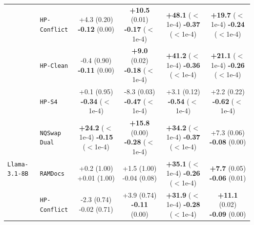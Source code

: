 \documentclass[11pt]{article}
\begin{document}
\begin{table}[t]
{{\begin{tabular}{llcccc}
& \texttt{HP-Conflict} & \shortstack{+4.3 (0.20)\\[1pt]\textbf{-0.12} (0.00)} & \shortstack{\textbf{+10.5} (0.01)\\[1pt]\textbf{-0.17} ($<$1e-4)} & \shortstack{\textbf{+48.1} ($<$1e-4)\\[1pt]\textbf{-0.37} ($<$1e-4)} & \shortstack{\textbf{+19.7} ($<$1e-4)\\[1pt]\textbf{-0.24} ($<$1e-4)} \\[3.5pt]
& \texttt{HP-Clean} & \shortstack{-0.4 (0.90)\\[1pt]\textbf{-0.11} (0.00)} & \shortstack{\textbf{+9.0} (0.02)\\[1pt]\textbf{-0.18} ($<$1e-4)} & \shortstack{\textbf{+41.2} ($<$1e-4)\\[1pt]\textbf{-0.36} ($<$1e-4)} & \shortstack{\textbf{+21.1} ($<$1e-4)\\[1pt]\textbf{-0.26} ($<$1e-4)} \\[3.5pt]
& \texttt{HP-S4} & \shortstack{+0.1 (0.95)\\[1pt]\textbf{-0.34} ($<$1e-4)} & \shortstack{-8.3 (0.03)\\[1pt]\textbf{-0.47} ($<$1e-4)} & \shortstack{+3.1 (0.12)\\[1pt]\textbf{-0.54} ($<$1e-4)} & \shortstack{+2.2 (0.22)\\[1pt]\textbf{-0.62} ($<$1e-4)} \\[3.5pt]
\midrule
\multirow{5}{*}{\texttt{Llama-3.1-8B}}
& \texttt{NQSwap Dual} & \shortstack{\textbf{+24.2} ($<$1e-4)\\[1pt]\textbf{-0.15} ($<$1e-4)} & \shortstack{\textbf{+15.8} (0.00)\\[1pt]\textbf{-0.28} ($<$1e-4)} & \shortstack{\textbf{+34.2} ($<$1e-4)\\[1pt]\textbf{-0.37} ($<$1e-4)} & \shortstack{+7.3 (0.06)\\[1pt]\textbf{-0.08} (0.00)} \\[3.5pt]
& \texttt{RAMDocs} & \shortstack{+0.2 (1.00)\\[1pt]+0.01 (1.00)} & \shortstack{+1.5 (1.00)\\[1pt]-0.04 (0.08)} & \shortstack{\textbf{+35.1} ($<$1e-4)\\[1pt]\textbf{-0.26} ($<$1e-4)} & \shortstack{\textbf{+7.7} (0.05)\\[1pt]\textbf{-0.06} (0.01)} \\[3.5pt]
& \texttt{HP-Conflict} & \shortstack{-2.3 (0.74)\\[1pt]-0.02 (0.71)} & \shortstack{+3.9 (0.74)\\[1pt]\textbf{-0.11} (0.00)} & \shortstack{\textbf{+31.9} ($<$1e-4)\\[1pt]\textbf{-0.28} ($<$1e-4)} & \shortstack{\textbf{+11.1} (0.02)\\[1pt]\textbf{-0.09} (0.00)} \\[3.5pt]

\end{tabular}}}
\end{table}
\end{document}
